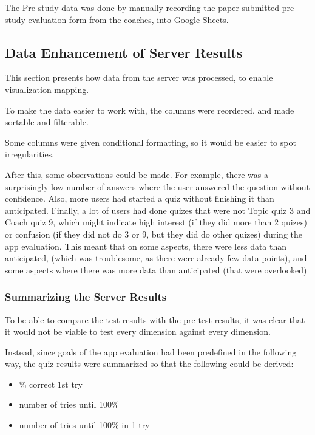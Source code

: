The Pre-study data was done by manually recording the paper-submitted pre-study evaluation form from the coaches, into Google Sheets.

\subsection{Data Enhancement of Server Results}

This section presents how data from the server was processed, to enable visualization mapping.

To make the data easier to work with, the columns were reordered, and made sortable and filterable.

Some columns were given conditional formatting, so it would be easier to spot irregularities.


After this, some observations could be made. For example, there was a surprisingly low number of answers where the user answered the question without confidence. Also, more users had started a quiz without finishing it than anticipated. Finally, a lot of users had done quizes that were not Topic quiz 3 and Coach quiz 9, which might indicate high interest (if they did more than 2 quizes) or confusion (if they did not do 3 or 9, but they did do other quizes) during the app evaluation. This meant that on some aspects, there were less data than anticipated, (which was troublesome, as there were already few data points), and some aspects where there was more data than anticipated (that were overlooked)

\subsubsection{Summarizing the Server Results}

To be able to compare the test results with the pre-test results, it was clear that it would not be viable to test every dimension against every dimension.

Instead, since goals of the app evaluation had been predefined in the following way, the quiz results were summarized so that the following could be derived:

\begin{itemize}
\item \% correct 1st try
\item number of tries until 100\%
\item number of tries until 100\% in 1 try
\end{itemize}

